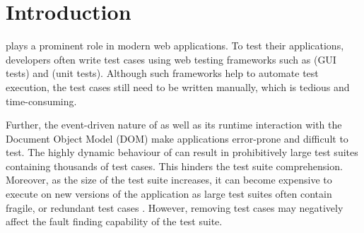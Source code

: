 \section{Introduction} \label{Sec:intro}
\javascript plays a prominent role in modern web applications. To test their \javascript applications,  developers often write test cases using web testing frameworks such as \selenium (GUI tests) and \qunit (\javascript unit tests). Although such frameworks help to automate test execution, the test cases still need to be written manually, which is tedious and time-consuming. 
 
Further, the event-driven nature of \javascript as well as its runtime interaction with the Document Object Model (DOM) make \javascript applications error-prone \cite{Ocariza:esem2013} and difficult to test. 
The highly dynamic behaviour of \javascript can result in prohibitively large test suites containing thousands of test cases. This hinders the test suite comprehension. Moreover, as the size of the test suite increases, it can become expensive to execute on new versions of the application as large test suites often contain fragile, or redundant test cases \cite{harrold:tosem1993}. However, removing test cases may negatively affect the fault finding capability of the test suite.
%
%
%

